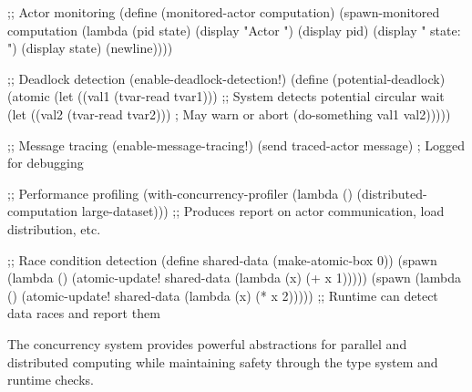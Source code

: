 \begin{example}
\begin{lambdustcode}
;; Actor monitoring
(define (monitored-actor computation)
  (spawn-monitored computation
    (lambda (pid state)
      (display "Actor ") (display pid) 
      (display " state: ") (display state) (newline))))

;; Deadlock detection
(enable-deadlock-detection!)
(define (potential-deadlock)
  (atomic 
    (let ((val1 (tvar-read tvar1)))
      ;; System detects potential circular wait
      (let ((val2 (tvar-read tvar2)))   ; May warn or abort
        (do-something val1 val2)))))

;; Message tracing
(enable-message-tracing!)
(send traced-actor message)   ; Logged for debugging

;; Performance profiling
(with-concurrency-profiler
  (lambda ()
    (distributed-computation large-dataset)))
;; Produces report on actor communication, load distribution, etc.

;; Race condition detection  
(define shared-data (make-atomic-box 0))
(spawn (lambda () (atomic-update! shared-data (lambda (x) (+ x 1)))))
(spawn (lambda () (atomic-update! shared-data (lambda (x) (* x 2)))))
;; Runtime can detect data races and report them
\end{lambdustcode}
\end{example}

The concurrency system provides powerful abstractions for parallel and distributed computing while maintaining safety through the type system and runtime checks.